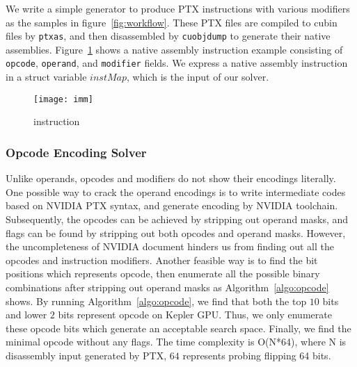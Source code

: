 We write a simple generator to produce PTX instructions with various modifiers as the samples in figure~\ref{fig:workflow}.
These PTX files are compiled to cubin files by {\tt ptxas}, and then disassembled by {\tt cuobjdump} to generate their native assemblies. 
Figure~\ref{fig:imm} shows a native assembly instruction example consisting of {\tt opcode}, {\tt operand}, and {\tt modifier} fields.
We express a native assembly instruction in a struct variable $instMap$, which is the input of our solver.
\begin{figure}[htbp]
\begin{center}
\texttt{[image: imm]}
    \caption{ instruction}
\label{fig:imm}
\end{center}
\end{figure}


\subsubsection{Opcode Encoding Solver}
Unlike operands, opcodes and modifiers do not show their encodings literally. One possible way to crack the operand 
encodings is to write intermediate codes
based on NVIDIA PTX syntax, and generate encoding by NVIDIA toolchain.
Subsequently, the opcodes can be achieved by stripping out operand masks, and
flags can be found by stripping out both opcodes and operand masks.
However, the uncompleteness of NVIDIA document hinders us from finding out all the opcodes and instruction modifiers. 
Another feasible way is to find the bit positions which represents opcode, then
enumerate all the possible binary combinations after stripping out operand masks as Algorithm~\ref{algo:opcode} shows.
By running Algorithm~\ref{algo:opcode}, we find that both the top $10$ bits and lower $2$ bits represent opcode on Kepler GPU.
Thus, we only enumerate these opcode bits which generate an acceptable search space. Finally, we find 
the minimal opcode without any flags. The time complexity is O(N*64), where N
is disassembly input generated by PTX, $64$ represents probing flipping 64
bits.

